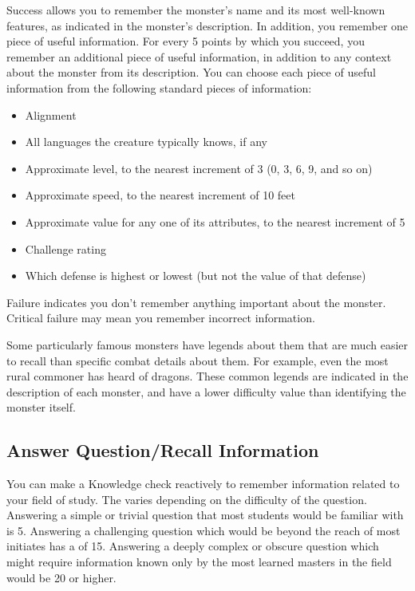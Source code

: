        Success allows you to remember the monster's name and its most well-known features, as indicated in the monster's description.
        In addition, you remember one piece of useful information.
        For every 5 points by which you succeed, you remember an additional piece of useful information, in addition to any context about the monster from its description.
        You can choose each piece of useful information from the following standard pieces of information:
        \begin{itemize}
            \item Alignment
            \item All languages the creature typically knows, if any
            \item Approximate level, to the nearest increment of 3 (0, 3, 6, 9, and so on)
            \item Approximate speed, to the nearest increment of 10 feet
            \item Approximate value for any one of its attributes, to the nearest increment of 5
            \item Challenge rating
            \item Which defense is highest or lowest (but not the value of that defense)
        \end{itemize}

        Failure indicates you don't remember anything important about the monster.
        Critical failure may mean you remember incorrect information.

        Some particularly famous monsters have legends about them that are much easier to recall than specific combat details about them.
        For example, even the most rural commoner has heard of dragons.
        These common legends are indicated in the description of each monster, and have a lower difficulty value than identifying the monster itself.

    \subsection{Answer Question/Recall Information}
        You can make a Knowledge check reactively to remember information related to your field of study. The  varies depending on the difficulty of the question. Answering a simple or trivial question that most students would be familiar with is  5. Answering a challenging question which would be beyond the reach of most initiates has a  of 15. Answering a deeply complex or obscure question which might require information known only by the most learned masters in the field would be  20 or higher.


